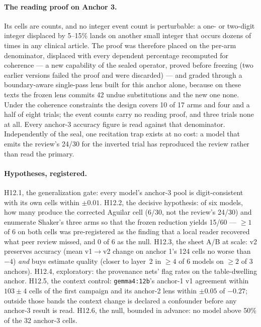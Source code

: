 \documentclass[11pt]{article}
\begin{document}
\paragraph{The reading proof on Anchor 3.} Its cells are counts, and no integer event count is perturbable: a one- or two-digit integer displaced by 5--15\% lands on another small integer that occurs dozens of times in any clinical article. The proof was therefore placed on the per-arm denominator, displaced with every dependent percentage recomputed for coherence --- a new capability of the sealed operator, proved before freezing (two earlier versions failed the proof and were discarded) --- and graded through a boundary-aware single-pass lens built for this anchor alone, because on these texts the frozen lens commits 42 undue substitutions and the new one none. Under the coherence constraints the design covers 10 of 17 arms and four and a half of eight trials; the event counts carry no reading proof, and three trials none at all. Every anchor-3 accuracy figure is read against that denominator. Independently of the seal, one recitation trap exists at no cost: a model that emits the review's 24/30 for the inverted trial has reproduced the review rather than read the primary.

\paragraph{Hypotheses, registered.} H12.1, the generalization gate: every model's anchor-3 pool is digit-consistent with its own cells within $\pm0.01$. H12.2, the decisive hypothesis: of six models, how many produce the corrected Aguilar cell (6/30, not the review's 24/30) and enumerate Shaker's three arms so that the frozen reduction yields 15/60 --- $\geq1$ of 6 on both cells was pre-registered as the finding that a local reader recovered what peer review missed, and 0 of 6 as the null. H12.3, the sheet A/B at scale: v2 preserves accuracy (mean v1$\rightarrow$v2 change on anchor 1's 124 cells no worse than $-4$) \emph{and} buys estimate quality (closer to layer~2 in $\geq4$ of 6 models on $\geq2$ of 3 anchors). H12.4, exploratory: the provenance nets' flag rates on the table-dwelling anchor. H12.5, the context control: \texttt{gemma4:12b}'s anchor-1 v1 agreement within $103\pm4$ cells of the first campaign and its anchor-2 lens within $\pm0.05$ of $-0.27$; outside those bands the context change is declared a confounder before any anchor-3 result is read. H12.6, the null, bounded in advance: no model above 50\% of the 32 anchor-3 cells.
\end{document}
